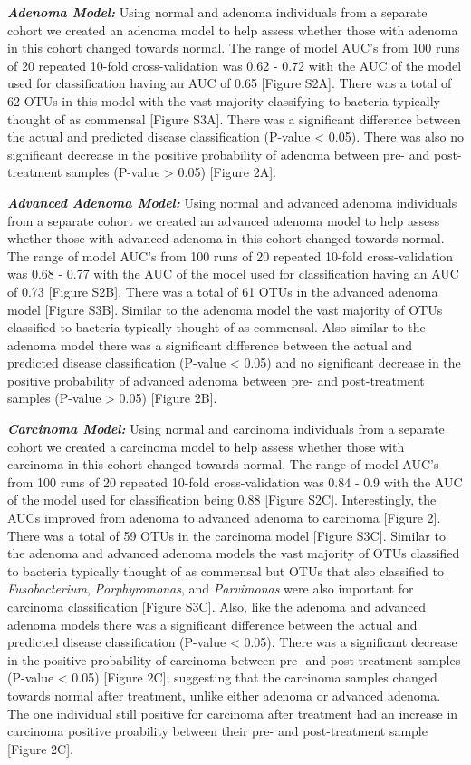 \documentclass[12pt,]{article}
\begin{document}
\textbf{\emph{Adenoma Model:}} Using normal and adenoma individuals from
a separate cohort we created an adenoma model to help assess whether
those with adenoma in this cohort changed towards normal. The range of
model AUC's from 100 runs of 20 repeated 10-fold cross-validation was
0.62 - 0.72 with the AUC of the model used for classification having an
AUC of 0.65 {[}Figure S2A{]}. There was a total of 62 OTUs in this model
with the vast majority classifying to bacteria typically thought of as
commensal {[}Figure S3A{]}. There was a significant difference between
the actual and predicted disease classification (P-value \textless{}
0.05). There was also no significant decrease in the positive
probability of adenoma between pre- and post-treatment samples (P-value
\textgreater{} 0.05) {[}Figure 2A{]}.

\textbf{\emph{Advanced Adenoma Model:}} Using normal and advanced
adenoma individuals from a separate cohort we created an advanced
adenoma model to help assess whether those with advanced adenoma in this
cohort changed towards normal. The range of model AUC's from 100 runs of
20 repeated 10-fold cross-validation was 0.68 - 0.77 with the AUC of the
model used for classification having an AUC of 0.73 {[}Figure S2B{]}.
There was a total of 61 OTUs in the advanced adenoma model {[}Figure
S3B{]}. Similar to the adenoma model the vast majority of OTUs
classified to bacteria typically thought of as commensal. Also similar
to the adenoma model there was a significant difference between the
actual and predicted disease classification (P-value \textless{} 0.05)
and no significant decrease in the positive probability of advanced
adenoma between pre- and post-treatment samples (P-value \textgreater{}
0.05) {[}Figure 2B{]}.

\textbf{\emph{Carcinoma Model:}} Using normal and carcinoma individuals
from a separate cohort we created a carcinoma model to help assess
whether those with carcinoma in this cohort changed towards normal. The
range of model AUC's from 100 runs of 20 repeated 10-fold
cross-validation was 0.84 - 0.9 with the AUC of the model used for
classification being 0.88 {[}Figure S2C{]}. Interestingly, the AUCs
improved from adenoma to advanced adenoma to carcinoma {[}Figure 2{]}.
There was a total of 59 OTUs in the carcinoma model {[}Figure S3C{]}.
Similar to the adenoma and advanced adenoma models the vast majority of
OTUs classified to bacteria typically thought of as commensal but OTUs
that also classified to \emph{Fusobacterium}, \emph{Porphyromonas}, and
\emph{Parvimonas} were also important for carcinoma classification
{[}Figure S3C{]}. Also, like the adenoma and advanced adenoma models
there was a significant difference between the actual and predicted
disease classification (P-value \textless{} 0.05). There was a
significant decrease in the positive probability of carcinoma between
pre- and post-treatment samples (P-value \textless{} 0.05) {[}Figure
2C{]}; suggesting that the carcinoma samples changed towards normal
after treatment, unlike either adenoma or advanced adenoma. The one
individual still positive for carcinoma after treatment had an increase
in carcinoma positive proability between their pre- and post-treatment
sample {[}Figure 2C{]}.
\end{document}
